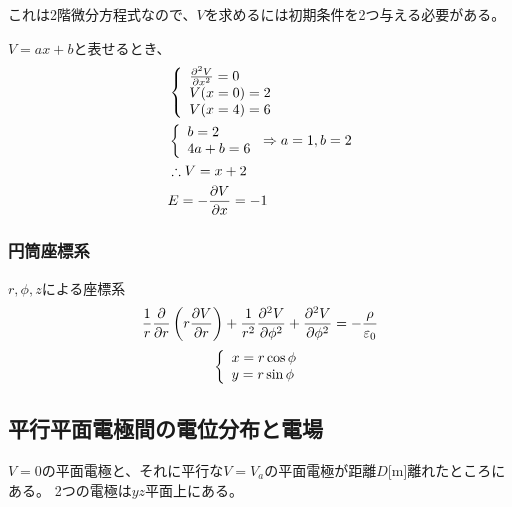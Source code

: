 \documentclass[12pt]{ltjsarticle}
\begin{document}
これは2階微分方程式なので、$V$を求めるには初期条件を2つ与える必要がある。

$V=ax+b$と表せるとき、
\begin{align*}
&\left\{
\begin{array}{l}
\frac{\partial {^2V}}{\partial {x^2}}=0\\
V(x=0)=2\\
V(x=4)=6
\end{array}
\right.\\
&\left\{
\begin{array}{l}
b=2\\
4a+b=6\\
\end{array}
\right.
\Rightarrow a=1,b=2\\
&\therefore V=x+2\\
&E=-\frac{\partial {V}}{\partial {x}}=-1
\end{align*}

\newenvironment{simul}[0]{\left\{ \begin{array}{l}}{\end{array} \right.}

\subsubsection*{円筒座標系}
$r,\phi,z$による座標系
\begin{align*}
\frac1r\frac{\partial {}}{\partial {r}}\left(r\frac{\partial {V}}{\partial {r}}\right)+
\frac1{r^2}\frac{\partial {^2V}}{\partial {\phi^2}}+
\frac{\partial {^2V}}{\partial {\phi^2}}
=-\frac\rho{\varepsilon_0}
\end{align*}
\begin{align*}
\begin{simul}
x=r\cos\phi\\
y=r\sin\phi
\end{simul}
\end{align*}

\subsection{平行平面電極間の電位分布と電場}
$V=0$の平面電極と、それに平行な$V=V_a$の平面電極が距離$D$[m]離れたところにある。
2つの電極は$yz$平面上にある。
\end{document}
